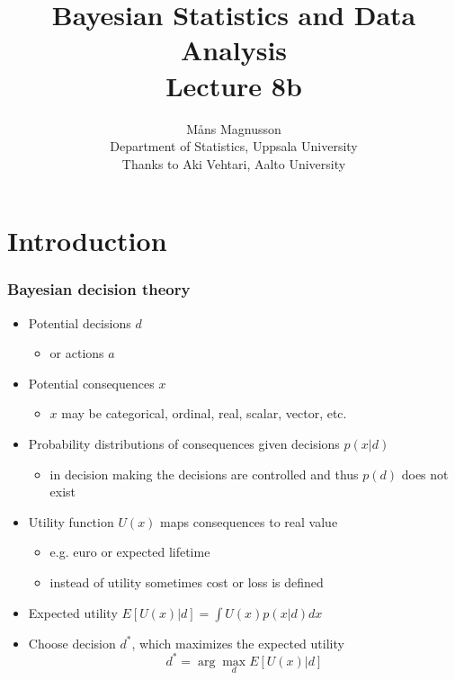 \documentclass[10pt,handout]{beamer}
\title[]{{\color{black}Bayesian Statistics and Data Analysis \\ Lecture 8b}}
\author[]{M{\aa}ns Magnusson \\ Department of Statistics, Uppsala University \\ Thanks to Aki Vehtari, Aalto University}
\date{}
\begin{document}
\frame{\titlepage
}



\section{Introduction}
\frame{\sectionpage}


\begin{frame}

\frametitle{Bayesian decision theory}

  \begin{itemize}
  \item<+-> Potential decisions $d$
    \begin{itemize}
      \item or actions $a$
    \end{itemize}
  \item<+-> Potential consequences $x$
    \begin{itemize}
      \item $x$ may be categorical, ordinal, real, scalar, vector, etc.
    \end{itemize}
  \item<+-> Probability distributions of consequences given decisions $p(x|d)$
    \begin{itemize}
    \item in decision making the decisions are controlled and thus $p(d)$ does not exist
    \end{itemize}
  \item<+->  Utility function $U(x)$ maps consequences to real value
    \begin{itemize}
      \item e.g. euro or expected lifetime
      \item instead of utility sometimes cost or loss is defined
    \end{itemize}
    \vspace{-1mm}
  \item<+-> Expected utility  $E[U(x)|d]=\int U(x) p(x|d) dx$
  \item<+-> Choose decision $d^*$, which maximizes the expected utility
    \begin{equation*}
      d^*=\arg\max_d E[U(x)|d]
    \end{equation*}
  \end{itemize}

\end{frame}
\end{document}
